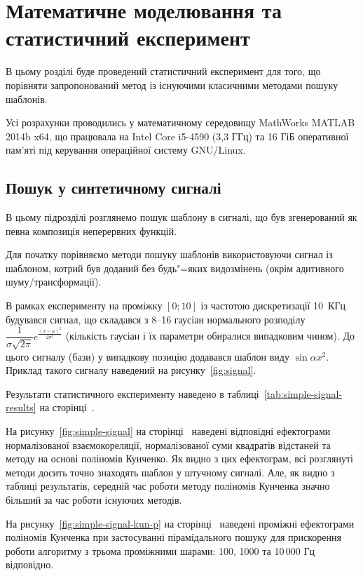 \chapter{Математичне моделювання та статистичний експеримент}
\label{chap:testing}

В цьому розділі буде проведений статистичний експеримент для того, що порівняти запропонований метод із існуючими
класичними методами пошуку шаблонів.

Усі розрахунки проводились у математичному середовищу MathWorks MATLAB 2014b x64, що працювала на Intel\texttrademark
Core i5-4590 (3,3 ГГц) та 16 ГіБ оперативної пам’яті під керування операційної систему GNU/Linux.
\section{Пошук у синтетичному сигналі}
    В цьому підрозділі розглянемо пошук шаблону в сигналі, що був згенерований як певна композиція неперервних
    функцій.

    Для початку порівняємо методи пошуку шаблонів використовуючи сигнал із шаблоном, котрий був доданий без
    будь"=яких видозмінень (окрім адитивного шуму/трансформації).

    В рамках експерименту на проміжку ${[0; 10]}$ із частотою дискретизації 10~КГц будувався сигнал, що складався
    з 8--16 гаусіан нормального розподілу $\dfrac{1}{\sigma\sqrt{2\pi}}
    e^{\frac{{\left(x-\mu\right)}^2}{2\sigma^2}}$
    (кількість гаусіан і їх параметри обиралися випадковим чином).
    До цього сигналу (бази) у випадкову позицію додавався шаблон виду $\sin{\alpha x^2}$.
    Приклад такого сигналу наведений на рисунку~\ref{fig:signal}.

    Результати статистичного експерименту наведено в таблиці~\ref{tab:simple-signal-results} на
    сторінці~\pageref{tab:simple-signal-results}.

    На рисунку~\ref{fig:simple-signal} на сторінці~\pageref{fig:simple-signal} наведені відповідні ефектограми
    нормалізованої взаємокореляції, нормалізованої суми квадратів відстаней та методу на основі поліномів Кунченко.
    Як видно з цих ефектограм, всі розглянуті методи досить точно знаходять шаблон у штучному сигналі.
    Але, як видно з таблиці результатів, середній час роботи методу поліномів Кунченка значно більший за час роботи
    існуючих методів.

    На рисунку~\ref{fig:simple-signal-kun-p} на сторінці~\pageref{fig:simple-signal-kun-p} наведені проміжні
    ефектограми поліномів Кунченка при застосуванні пірамідального пошуку для прискорення роботи алгоритму з трьома
    проміжними шарами: 100, 1000 та 10\,000 Гц відповідно.

